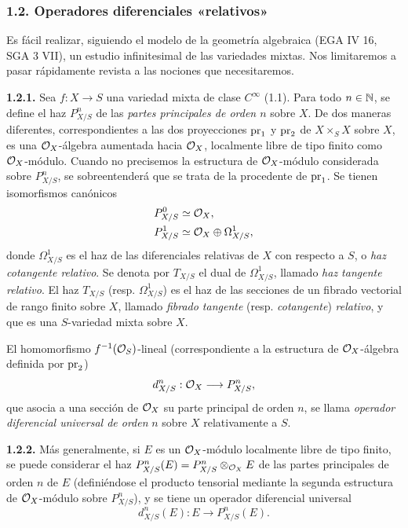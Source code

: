 \providecommand{\sisi}[2]{#2}

\subsubsection*{1.2. Operadores diferenciales «relativos»}
Es fácil realizar, siguiendo el modelo de la geometría algebraica (EGA IV 16, SGA 3 VII), un estudio infinitesimal de las variedades mixtas. Nos limitaremos a pasar rápidamente revista a las nociones que necesitaremos.

\textbf{1.2.1.} Sea $f:X\to S$ una variedad mixta de clase $C^\infty$ (1.1). Para todo $n\in\mathbb N$, se define el haz $P^n_{X/S}$ de las \emph{partes principales de orden $n$} sobre $X$. De dos maneras diferentes, correspondientes a las dos proyecciones $\operatorname{pr}_1$ y $\operatorname{pr}_2$ de $X\times_S X$ sobre $X$, es una $\mathcal O_X$-álgebra aumentada hacia $\mathcal O_X$, localmente libre de tipo finito como $\mathcal O_X$-módulo. Cuando no precisemos la estructura de $\mathcal O_X$-módulo considerada sobre $P^n_{X/S}$, se sobreentenderá que se trata de la procedente de $\operatorname{pr}_1$. Se tienen isomorfismos canónicos
\[
 \begin{aligned}
 P^0_{X/S}&\simeq\mathcal O_X,\\
 P^1_{X/S}&\simeq\mathcal O_X\oplus\Omega^1_{X/S},
 \end{aligned}
\]
donde $\Omega^1_{X/S}$ es el haz de las diferenciales relativas de $X$ con respecto a $S$, o \emph{haz cotangente relativo}. Se denota por $T_{X/S}$ el dual de $\Omega^1_{X/S}$, llamado \emph{haz tangente relativo}. El haz $T_{X/S}$ (resp. $\Omega^1_{X/S}$) es el haz de las secciones de un fibrado vectorial de rango finito sobre $X$, llamado \emph{fibrado tangente} (resp. \emph{cotangente}) \emph{relativo}, y que es una $S$-variedad mixta sobre $X$.

El homomorfismo $f^{-1}(\mathcal O_S)$-lineal (correspondiente a la estructura de $\mathcal O_X$-álgebra definida por $\operatorname{pr}_2$)
\[
 d^n_{X/S}:\mathcal O_X\longrightarrow P^n_{X/S},
\]
que asocia a una sección de $\mathcal O_X$ su parte principal de orden $n$, se llama \emph{operador diferencial universal de orden} $n$ sobre $X$ relativamente a $S$.

\textbf{1.2.2.} Más generalmente, si $E$ es un $\mathcal O_X$-módulo localmente libre de tipo finito, se puede considerar el haz $P^n_{X/S}(E)=P^n_{X/S}\otimes_{\mathcal O_X}E$ de las partes principales de orden $n$ de $E$ (definiéndose el producto tensorial mediante la segunda estructura de $\mathcal O_X$-módulo sobre $P^n_{X/S}$), y se tiene un operador diferencial universal
\[
 d^n_{X/S}(E):E\longrightarrow P^n_{X/S}(E).
\]

